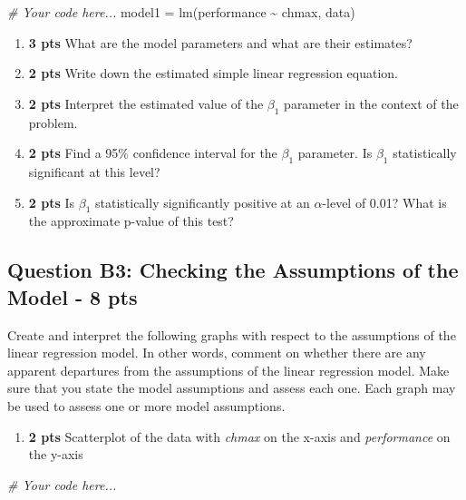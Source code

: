 \documentclass[
]{article}
\newenvironment{Shaded}{\begin{snugshade}}{\end{snugshade}}
\newcommand{\CommentTok}[1]{\textcolor[rgb]{0.56,0.35,0.01}{\textit{#1}}}
\newcommand{\FunctionTok}[1]{\textcolor[rgb]{0.00,0.00,0.00}{#1}}
\newcommand{\NormalTok}[1]{#1}
\newcommand{\OtherTok}[1]{\textcolor[rgb]{0.56,0.35,0.01}{#1}}
\newcommand{\SpecialCharTok}[1]{\textcolor[rgb]{0.00,0.00,0.00}{#1}}
\providecommand{\tightlist}{%
  \setlength{\itemsep}{0pt}\setlength{\parskip}{0pt}}
\begin{document}
\begin{Shaded}
\begin{Highlighting}[]
\CommentTok{\# Your code here...}
\NormalTok{model1 }\OtherTok{=} \FunctionTok{lm}\NormalTok{(performance }\SpecialCharTok{\textasciitilde{}}\NormalTok{ chmax, data)}
\end{Highlighting}
\end{Shaded}

\begin{enumerate}
\def\labelenumi{\alph{enumi}.}
\item
  \textbf{3 pts} What are the model parameters and what are their
  estimates?
\item
  \textbf{2 pts} Write down the estimated simple linear regression
  equation.
\item
  \textbf{2 pts} Interpret the estimated value of the \(\beta_1\)
  parameter in the context of the problem.
\item
  \textbf{2 pts} Find a 95\% confidence interval for the \(\beta_1\)
  parameter. Is \(\beta_1\) statistically significant at this level?
\item
  \textbf{2 pts} Is \(\beta_1\) statistically significantly positive at
  an \(\alpha\)-level of 0.01? What is the approximate p-value of this
  test?
\end{enumerate}

\hypertarget{question-b3-checking-the-assumptions-of-the-model---8-pts}{%
\subsection{Question B3: Checking the Assumptions of the Model - 8
pts}\label{question-b3-checking-the-assumptions-of-the-model---8-pts}}

Create and interpret the following graphs with respect to the
assumptions of the linear regression model. In other words, comment on
whether there are any apparent departures from the assumptions of the
linear regression model. Make sure that you state the model assumptions
and assess each one. Each graph may be used to assess one or more model
assumptions.

\begin{enumerate}
\def\labelenumi{\alph{enumi}.}
\tightlist
\item
  \textbf{2 pts} Scatterplot of the data with \emph{chmax} on the x-axis
  and \emph{performance} on the y-axis
\end{enumerate}

\begin{Shaded}
\begin{Highlighting}[]
\CommentTok{\# Your code here...}
\end{Highlighting}
\end{Shaded}
\end{document}
